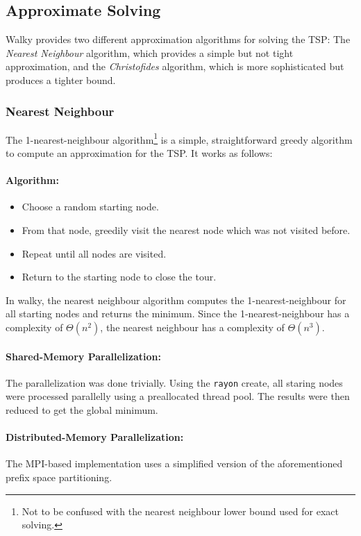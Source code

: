 \subsection{Approximate Solving}
Walky provides two different approximation algorithms for solving the \ac{TSP}: The \emph{Nearest Neighbour} algorithm, which provides a simple but not tight approximation, and the \emph{Christofides} algorithm, which is more sophisticated but produces a tighter bound.

\subsubsection{Nearest Neighbour}
The 1-nearest-neighbour algorithm\footnote{Not to be confused with the nearest neighbour lower bound used for exact solving.} is a simple, straightforward greedy algorithm to compute an approximation for the \ac{TSP}. It works as follows:

\paragraph{Algorithm:}

\begin{itemize}
\item Choose a random starting node.
\item From that node, greedily visit the nearest node which was not visited before.
\item Repeat until all nodes are visited.
\item Return to the starting node to close the tour.
\end{itemize}

In walky, the nearest neighbour algorithm computes the 1-nearest-neighbour for all starting nodes and returns the minimum. Since the 1-nearest-neighbour has a complexity of $\Theta(n^2)$, the nearest neighbour has a complexity of $\Theta(n^3)$.

\paragraph{Shared-Memory Parallelization:} The parallelization was done trivially. Using the \texttt{rayon} create, all staring nodes were processed parallelly using a preallocated thread pool. The results were then reduced to get the global minimum.

\paragraph{Distributed-Memory Parallelization:} The \acs{MPI}-based implementation uses a simplified version of the aforementioned prefix space partitioning.


